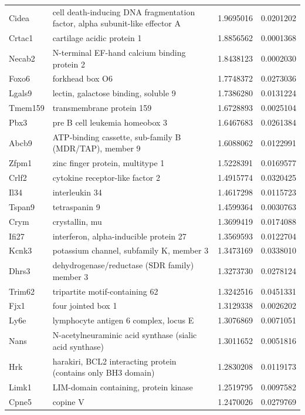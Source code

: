 \documentclass[onehalf,12pt]{beavtex}
\begin{document}
\begin{landscape}
\begin{longtable}{llrr}
  Cidea & cell death-inducing DNA fragmentation factor, alpha subunit-like effector A & 1.9695016 & 0.0201202\\
  Crtac1 & cartilage acidic protein 1 & 1.8856562 & 0.0001368\\
  Necab2 & N-terminal EF-hand calcium binding protein 2 & 1.8438123 & 0.0002030\\
  Foxo6 & forkhead box O6 & 1.7748372 & 0.0273036\\
  \addlinespace
  Lgals9 & lectin, galactose binding, soluble 9 & 1.7386280 & 0.0131224\\
  Tmem159 & transmembrane protein 159 & 1.6728893 & 0.0025104\\
  Pbx3 & pre B cell leukemia homeobox 3 & 1.6467683 & 0.0261384\\
  Abcb9 & ATP-binding cassette, sub-family B (MDR/TAP), member 9 & 1.6088062 & 0.0122991\\
  Zfpm1 & zinc finger protein, multitype 1 & 1.5228391 & 0.0169577\\
  \addlinespace
  Crlf2 & cytokine receptor-like factor 2 & 1.4915774 & 0.0320425\\
  Il34 & interleukin 34 & 1.4617298 & 0.0115723\\
  Tspan9 & tetraspanin 9 & 1.4599364 & 0.0030763\\
  Crym & crystallin, mu & 1.3699419 & 0.0174088\\
  Ifi27 & interferon, alpha-inducible protein 27 & 1.3569593 & 0.0122704\\
  \addlinespace
  Kcnk3 & potassium channel, subfamily K, member 3 & 1.3473169 & 0.0338010\\
  Dhrs3 & dehydrogenase/reductase (SDR family) member 3 & 1.3273730 & 0.0278124\\
  Trim62 & tripartite motif-containing 62 & 1.3242516 & 0.0451331\\
  Fjx1 & four jointed box 1 & 1.3129338 & 0.0026202\\
  Ly6e & lymphocyte antigen 6 complex, locus E & 1.3076869 & 0.0071051\\
  \addlinespace
  Nans & N-acetylneuraminic acid synthase (sialic acid synthase) & 1.3011652 & 0.0051816\\
  Hrk & harakiri, BCL2 interacting protein (contains only BH3 domain) & 1.2830208 & 0.0119173\\
  Limk1 & LIM-domain containing, protein kinase & 1.2519795 & 0.0097582\\
  Cpne5 & copine V & 1.2470026 & 0.0279769\\

\end{longtable}
\end{landscape}
\end{document}
